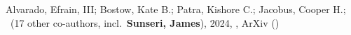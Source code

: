 \item Alvarado, Efrain, III; Bostow, Kate B.; Patra, Kishore C.; Jacobus, Cooper H.; \etal\ ({17} other co-authors, incl.\ \textbf{Sunseri, James}), 2024, , ArXiv ()